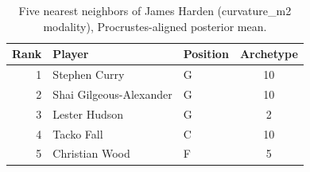 \begin{table}[htbp]
  \centering\small
  \begin{tabular}{rllc}
    \toprule
    Rank & Player & Position & Archetype \\
    \midrule
    1 & Stephen Curry & G & 10 \\
    2 & Shai Gilgeous-Alexander & G & 10 \\
    3 & Lester Hudson & G & 2 \\
    4 & Tacko Fall & C & 10 \\
    5 & Christian Wood & F & 5 \\
    \bottomrule
  \end{tabular}
  \caption{Five nearest neighbors of James Harden (curvature_m2 modality), Procrustes-aligned posterior mean.}
  \label{tab:James_Harden_neighbors_curvature_m2}
\end{table}

